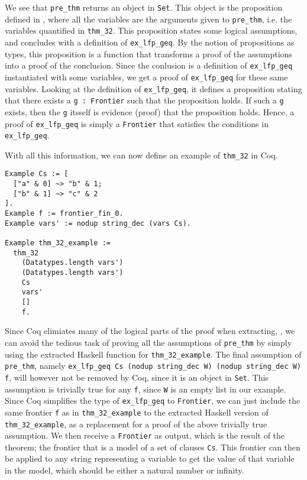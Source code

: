 We see that \lstinline{pre_thm} returns an object in \lstinline{Set}.
This object is the proposition defined in ,
where all the variables are the arguments given to \lstinline{pre_thm}, i.e. the variables quantified in \lstinline{thm_32}.
This proposition states some logical assumptions, and concludes with a definition of \lstinline{ex_lfp_geq}.
By the notion of propositions as types, this proposition is a function
that transforms a proof of the assumptions into a proof of the conclusion.
Since the conlusion is a definition of \lstinline{ex_lfp_geq} instantiated with some variables,
we get a proof of \lstinline{ex_lfp_geq} for these same variables.
Looking at the definition of \lstinline{ex_lfp_geq},
it defines a proposition stating that there exists a \lstinline{g : Frontier} such that the proposition holds.
If such a \lstinline{g} exists, then the \lstinline{g} itsself is evidence (proof) that the proposition holds.
Hence, a proof of \lstinline{ex_lfp_geq} is simply a \lstinline{Frontier} that satisfies the conditions in \lstinline{ex_lfp_geq}.

With all this information, we can now define an example of \lstinline{thm_32} in Coq.

\begin{minipage}{\linewidth}
\begin{lstlisting}[language=Coq, label={lst:thm_32_coq_example}, caption={\lstinline{thm_32} example}]
Example Cs := [
  ["a" & 0] ~> "b" & 1;
  ["b" & 1] ~> "c" & 2
].
Example f := frontier_fin_0.
Example vars' := nodup string_dec (vars Cs).

Example thm_32_example :=
  thm_32
    (Datatypes.length vars')
    (Datatypes.length vars')
    Cs
    vars'
    []
    f.
\end{lstlisting}
\end{minipage}

Since Coq elimiates many of the logical parts of the proof when extracting,
\cite[p. ~8]{coqextroverview},
we can avoid the tedious task of proving all the assumptions of \lstinline{pre_thm} by simply
using the extracted Haskell function for \lstinline{thm_32_example}.
The final assumption of \lstinline{pre_thm}, namely \lstinline{ex_lfp_geq Cs (nodup string_dec W) (nodup string_dec W) f},
will however not be removed by Coq, since it is an object in \lstinline{Set}.
This assumption is trivially true for any \lstinline{f}, since \lstinline{W} is an empty list in our example.
Since Coq simplifies the type of \lstinline{ex_lfp_geq} to \lstinline{Frontier},
we can just include the same frontier \lstinline{f} as in \lstinline{thm_32_example} to the extracted Haskell
version of \lstinline{thm_32_example}, as a replacement for a proof of the above trivially true assumption.
We then receive a \lstinline{Frontier} as output, which is the result of the theorem;
the frontier that is a model of a set of clauses \lstinline{Cs}.
This frontier can then be applied to any string representing a variable to get the value of that variable in the model,
which should be either a natural number or infinity.

